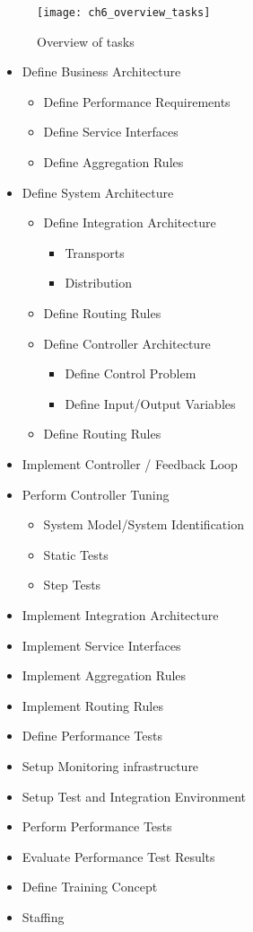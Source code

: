 \begin{figure}[htpb] \centering 
	\texttt{[image: ch6\_overview\_tasks]} 
	\caption{Overview of tasks} 
	\label{fig:ch6_overview_tasks} 
\end{figure}

\begin{itemize}
	\item Define Business Architecture
	\begin{itemize}
		\item Define Performance Requirements
		\item Define Service Interfaces
		\item Define Aggregation Rules
	\end{itemize}
	\item Define System Architecture 
	\begin{itemize}
		\item Define Integration Architecture
		\begin{itemize}
			\item Transports
			\item Distribution
		\end{itemize}
		\item Define Routing Rules
		\item Define Controller Architecture 
		\begin{itemize}
			\item Define Control Problem 
			\item Define Input/Output Variables 
		\end{itemize}
		\item Define Routing Rules
	\end{itemize}
	\item Implement Controller / Feedback Loop
	\item Perform Controller Tuning 
	\begin{itemize}
		\item System Model/System Identification 
		\item Static Tests
		\item Step Tests
	\end{itemize}
	\item Implement Integration Architecture
	\item Implement Service Interfaces
	\item Implement Aggregation Rules 
	\item Implement Routing Rules
	\item Define Performance Tests 
	\item Setup Monitoring infrastructure
	\item Setup Test and Integration Environment
	\item Perform Performance Tests
	\item Evaluate Performance Test Results
	\item Define Training Concept
	\item Staffing
\end{itemize}

